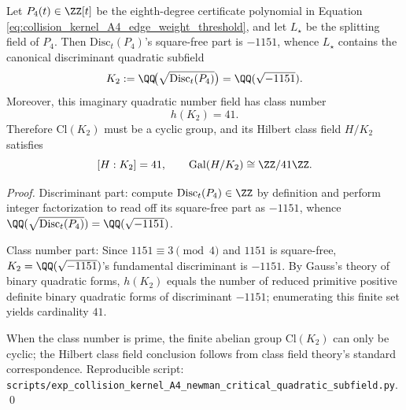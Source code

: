 \begin{proposition}\label{prop:pom-a4t-newman-k2-class-number}
Let \(P_4(t)\in\ZZ[t]\) be the eighth-degree certificate polynomial in Equation \eqref{eq:collision_kernel_A4_edge_weight_threshold}, and let \(L_\star\) be the splitting field of \(P_4\).
Then \(\mathrm{Disc}_t(P_4)\)'s square-free part is \(-1151\), whence \(L_\star\) contains the canonical discriminant quadratic subfield
\[
K_2:=\QQ\!\bigl(\sqrt{\mathrm{Disc}_t(P_4)}\bigr)=\QQ(\sqrt{-1151}).
\]
Moreover, this imaginary quadratic number field has class number
\[
h(K_2)=41.
\]
Therefore \(\mathrm{Cl}(K_2)\) must be a cyclic group, and its Hilbert class field \(H/K_2\) satisfies
\[
[H:K_2]=41,\qquad \mathrm{Gal}(H/K_2)\cong \ZZ/41\ZZ.
\]
\end{proposition}
\begin{proof}
Discriminant part: compute \(\mathrm{Disc}_t(P_4)\in\ZZ\) by definition and perform integer factorization to read off its square-free part as \(-1151\), whence \( \QQ(\sqrt{\mathrm{Disc}_t(P_4)})=\QQ(\sqrt{-1151}) \).
\par
Class number part: Since \(1151\equiv 3\pmod 4\) and \(1151\) is square-free, \(K_2=\QQ(\sqrt{-1151})\)'s fundamental discriminant is \(-1151\).
By Gauss's theory of binary quadratic forms, \(h(K_2)\) equals the number of reduced primitive positive definite binary quadratic forms of discriminant \(-1151\); enumerating this finite set yields cardinality \(41\).
\par
When the class number is prime, the finite abelian group \(\mathrm{Cl}(K_2)\) can only be cyclic; the Hilbert class field conclusion follows from class field theory's standard correspondence.
Reproducible script: \texttt{scripts/exp\_collision\_kernel\_A4\_newman\_critical\_quadratic\_subfield.py}. \qed
\end{proof}

